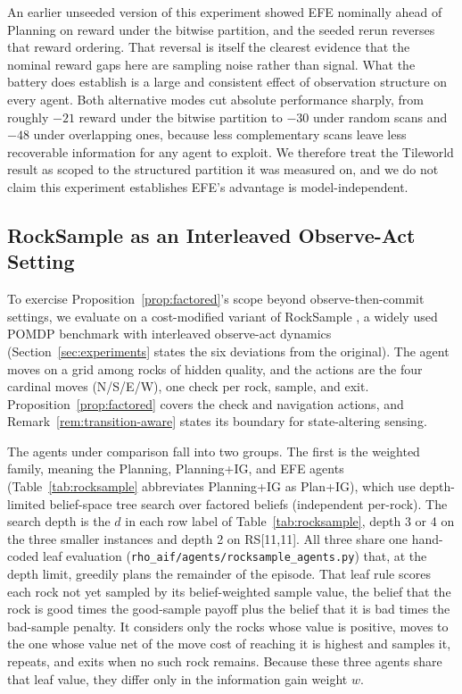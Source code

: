An earlier unseeded version of this experiment showed EFE nominally ahead of Planning on reward under the bitwise partition, and the seeded rerun reverses that reward ordering. That reversal is itself the clearest evidence that the nominal reward gaps here are sampling noise rather than signal. What the battery does establish is a large and consistent effect of observation structure on every agent. Both alternative modes cut absolute performance sharply, from roughly $-21$ reward under the bitwise partition to $-30$ under random scans and $-48$ under overlapping ones, because less complementary scans leave less recoverable information for any agent to exploit. We therefore treat the Tileworld result as scoped to the structured partition it was measured on, and we do not claim this experiment establishes EFE's advantage is model-independent.

\subsection{RockSample as an Interleaved Observe-Act Setting}
\label{app:rocksample_main_details}

To exercise Proposition~\ref{prop:factored}'s scope beyond observe-then-commit settings, we evaluate on a cost-modified variant of RockSample \citep{smith2004}, a widely used POMDP benchmark with interleaved observe-act dynamics (Section~\ref{sec:experiments} states the six deviations from the original). The agent moves on a grid among rocks of hidden quality, and the actions are the four cardinal moves (N/S/E/W), one check per rock, sample, and exit. Proposition~\ref{prop:factored} covers the check and navigation actions, and Remark~\ref{rem:transition-aware} states its boundary for state-altering sensing.

The agents under comparison fall into two groups. The first is the weighted family, meaning the Planning, Planning+IG, and EFE agents (Table~\ref{tab:rocksample} abbreviates Planning+IG as Plan+IG), which use depth-limited belief-space tree search over factored beliefs (independent per-rock). The search depth is the $d$ in each row label of Table~\ref{tab:rocksample}, depth 3 or 4 on the three smaller instances and depth 2 on RS[11,11]. All three share one hand-coded leaf evaluation (\texttt{rho\_\allowbreak aif/\allowbreak agents/\allowbreak rocksample\_\allowbreak agents.py}) that, at the depth limit, greedily plans the remainder of the episode. That leaf rule scores each rock not yet sampled by its belief-weighted sample value, the belief that the rock is good times the good-sample payoff plus the belief that it is bad times the bad-sample penalty. It considers only the rocks whose value is positive, moves to the one whose value net of the move cost of reaching it is highest and samples it, repeats, and exits when no such rock remains. Because these three agents share that leaf value, they differ only in the information gain weight $w$.

